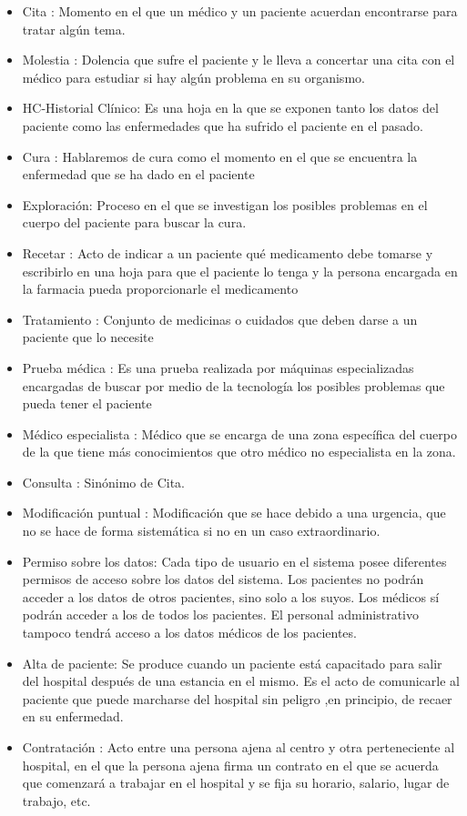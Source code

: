 \begin{itemize}
\item Cita : Momento en el que un médico y un paciente acuerdan encontrarse para tratar algún tema.
\item Molestia : Dolencia que sufre el paciente y le lleva a concertar una cita con el médico para estudiar si hay algún problema en su organismo.
\item HC-Historial Clínico: Es una hoja en la que se exponen tanto los datos del paciente como las enfermedades que ha sufrido el paciente en el pasado.
\item Cura : Hablaremos de cura como el momento en el que se encuentra la enfermedad que se ha dado en el paciente
\item Exploración: Proceso en el que se investigan los posibles problemas en el cuerpo del paciente para buscar la cura.
\item Recetar : Acto de indicar a un paciente qué medicamento debe tomarse y escribirlo en una hoja para que el paciente lo tenga y la persona encargada en la farmacia pueda proporcionarle el medicamento
\item Tratamiento : Conjunto de medicinas o cuidados que deben darse a un paciente que lo necesite

\item Prueba médica : Es una prueba realizada por máquinas especializadas encargadas de buscar por medio de la tecnología los posibles problemas que pueda tener el paciente

\item Médico especialista : Médico que se encarga de una zona específica del cuerpo de la que tiene más conocimientos que otro médico no especialista en la zona.

\item Consulta : Sinónimo de Cita.
\item Modificación puntual : Modificación que se hace debido a una urgencia, que no se hace de forma sistemática si no en un caso extraordinario.
\item Permiso sobre los datos: Cada tipo de usuario en el sistema posee diferentes permisos de acceso sobre los datos del sistema. Los pacientes no podrán acceder a los datos de otros pacientes, sino solo a los suyos. Los médicos sí podrán acceder a los de todos los pacientes. El personal administrativo tampoco tendrá acceso a los datos médicos de los pacientes.

\item Alta de paciente: Se produce cuando un paciente está capacitado para salir del hospital después de una estancia en el mismo. Es el acto de comunicarle al paciente que puede marcharse del hospital sin peligro ,en principio, de recaer en su enfermedad.

  \item Contratación : Acto entre una persona ajena al centro y otra perteneciente al hospital, en el que la persona ajena firma un contrato en el que se acuerda que comenzará a trabajar en el hospital y se fija su horario, salario, lugar de trabajo, etc.

  \end{itemize}
